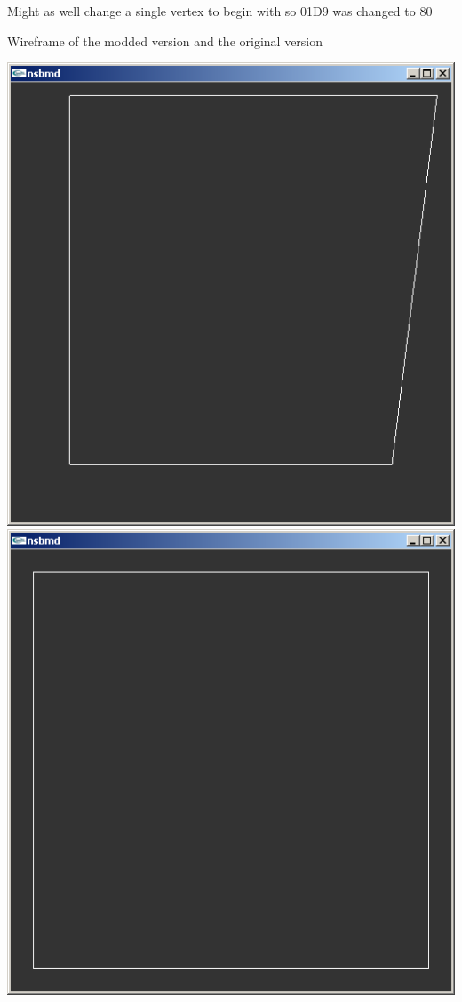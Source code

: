 \documentclass[
]{book}
\begin{document}
Might as well change a single vertex to begin with so 01D9 was changed to 80

Wireframe of the modded version and the original version

\includegraphics{images/65_home_fast6191_romhackingguide_unrenamed_file____romhackingguidegraphics3dminorNSMBDmodel_2.png}\includegraphics{images/66_home_fast6191_romhackingguide_unrenamed_file___uidegraphics3dminorNSMBDmodel_wireframeorig.png}
\end{document}
